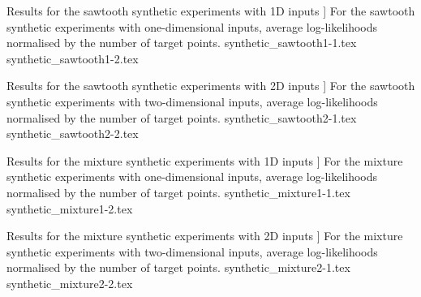 \documentclass[12pt, twoside]{report}
\begin{document}
\begin{table}[t]
    \centering
    \caption
    [
        Results for the sawtooth synthetic experiments with 1D inputs
    ]
    {
        For the sawtooth synthetic experiments with one-dimensional inputs, average log-likelihoods normalised by the number of target points.
        \oneddescription
        \latentvariabledescription
        \convabbrevdescription
        \trivialdescription
        \numbersdescription
    }
    \label{tab:synthetic_sawtooth-1}
    \footnotesize
    \setlength{\tabcolsep}{2pt}
    {synthetic_sawtooth1-1.tex}%
    {synthetic_sawtooth1-2.tex}
\end{table}

\begin{table}[t]
    \centering
    \caption
    [
        Results for the sawtooth synthetic experiments with 2D inputs
    ]
    {
        For the sawtooth synthetic experiments with two-dimensional inputs, average log-likelihoods normalised by the number of target points.
        \twoddescription
        \latentvariabledescription
        \convabbrevdescription
        \trivialdescription
        \numbersdescription
    }
    \label{tab:synthetic_sawtooth-2}
    \footnotesize
    \setlength{\tabcolsep}{2pt}
    {synthetic_sawtooth2-1.tex}%
    {synthetic_sawtooth2-2.tex}
\end{table}

\begin{table}[t]
    \centering
    \caption
    [
        Results for the mixture synthetic experiments with 1D inputs
    ]
    {
        For the mixture synthetic experiments with one-dimensional inputs, average log-likelihoods normalised by the number of target points.
        \oneddescription
        \latentvariabledescription
        \convabbrevdescription
        \trivialdescription
        \numbersdescription
    }
    \label{tab:synthetic_mixture-1}
    \footnotesize
    \setlength{\tabcolsep}{2pt}
    {synthetic_mixture1-1.tex}%
    {synthetic_mixture1-2.tex}
\end{table}

\begin{table}[t]
    \centering
    \caption
    [
        Results for the mixture synthetic experiments with 2D inputs
    ]
    {
        For the mixture synthetic experiments with two-dimensional inputs, average log-likelihoods normalised by the number of target points.
        \twoddescription
        \latentvariabledescription
        \convabbrevdescription
        \trivialdescription
        \numbersdescription
    }
    \label{tab:synthetic_mixture-2}
    \footnotesize
    \setlength{\tabcolsep}{2pt}
    {synthetic_mixture2-1.tex}%
    {synthetic_mixture2-2.tex}
\end{table}
\end{document}
